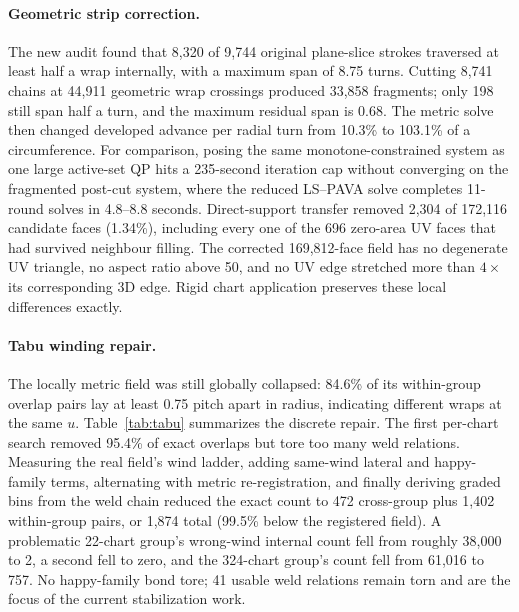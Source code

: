 \paragraph{Geometric strip correction.}
The new audit found that 8,320 of 9,744 original plane-slice strokes traversed at least half a wrap internally, with a maximum span of 8.75 turns. Cutting 8,741 chains at 44,911 geometric wrap crossings produced 33,858 fragments; only 198 still span half a turn, and the maximum residual span is 0.68. The metric solve then changed developed advance per radial turn from 10.3\% to 103.1\% of a circumference. For comparison, posing the same monotone-constrained system as one large active-set QP hits a 235-second iteration cap without converging on the fragmented post-cut system, where the reduced LS--PAVA solve completes 11-round solves in 4.8--8.8 seconds. Direct-support transfer removed 2,304 of 172,116 candidate faces (1.34\%), including every one of the 696 zero-area UV faces that had survived neighbour filling. The corrected 169,812-face field has no degenerate UV triangle, no aspect ratio above 50, and no UV edge stretched more than $4\times$ its corresponding 3D edge. Rigid chart application preserves these local differences exactly.

\paragraph{Tabu winding repair.}
The locally metric field was still globally collapsed: 84.6\% of its within-group overlap pairs lay at least 0.75 pitch apart in radius, indicating different wraps at the same $u$. Table~\ref{tab:tabu} summarizes the discrete repair. The first per-chart search removed 95.4\% of exact overlaps but tore too many weld relations. Measuring the real field's wind ladder, adding same-wind lateral and happy-family terms, alternating with metric re-registration, and finally deriving graded bins from the weld chain reduced the exact count to 472 cross-group plus 1,402 within-group pairs, or 1,874 total (99.5\% below the registered field). A problematic 22-chart group's wrong-wind internal count fell from roughly 38,000 to 2, a second fell to zero, and the 324-chart group's count fell from 61,016 to 757. No happy-family bond tore; 41 usable weld relations remain torn and are the focus of the current stabilization work.

